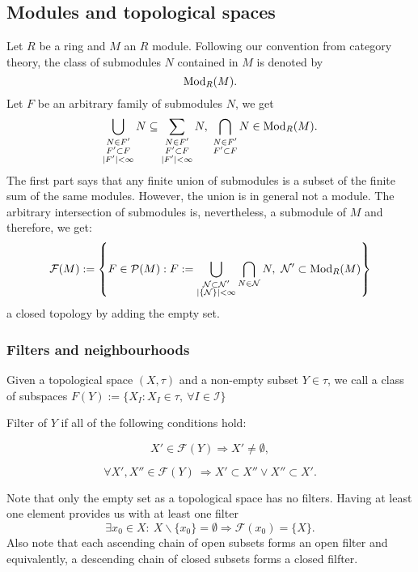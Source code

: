 \subsection{Modules and topological spaces}
Let $R$ be a ring and $M$ an $R$ module. Following our convention from category theory, the class of submodules $N$ contained in $M$ is denoted by
$$\mathrm{Mod}_R(M).$$
Let $F$ be an arbitrary family of submodules $N$, we get
$$\bigcup_{\substack{N \in F'\\F' \subset F\\|F'| < \infty}} N \subseteq \sum_{\substack{N \in F'\\F' \subset F\\|F'| < \infty}} N,\ \bigcap_{\substack{N \in F'\\F' \subset F\\}} N \in \mathrm{Mod}_R(M).$$
The first part says that any finite union of submodules is a subset of the finite sum of the same modules. However, the union is in general not a module. The arbitrary intersection of submodules is, nevertheless, a submodule of $M$ and therefore, we get:
$$\mathcal{F}(M) := \left\{F \in \mathcal{P}(M) : F := \bigcup_{\substack{\mathcal{N} \subset \mathcal{N'}\\|\{\mathcal{N}\}| < \infty\\}} \bigcap_{N \in \mathcal{N}} N,\ \mathcal{N'} \subset \mathrm{Mod}_R(M)\right\}$$
a closed topology by adding the empty set.
\subsubsection{Filters and neighbourhoods}
Given a topological space $(X, \tau)$ and a non-empty subset $Y \in \tau$, we call a class of subspaces $F(Y) := \{X_I : X_I \in \tau,\ \forall I \in \mathcal{I}\}$
\begin{defi}{Filter} of $Y$ if all of the following conditions hold:
\bn
\item $$X' \in \mathcal{F}(Y) \Rightarrow X' \neq \emptyset,$$
\item $$\forall X', X'' \in \mathcal{F}(Y)\ \Rightarrow X' \subset X'' \vee X'' \subset X'.$$
\en
$$$$
\end{defi}
Note that only the empty set as a topological space has no filters. Having at least one element provides us with at least one filter
$$\exists x_0 \in X:\ X\backslash \{x_0\} = \emptyset \Rightarrow \mathcal{F}(x_0) = \{X\}.$$
Also note that each ascending chain of open subsets forms an open filter and equivalently, a descending chain of closed subsets forms a closed filfter.
